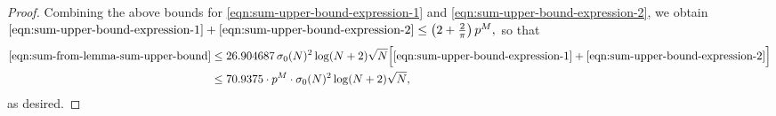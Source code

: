 \documentclass[10pt,a4paper]{amsart}
\begin{document}
\begin{proof}
Combining the above bounds for \eqref{eqn:sum-upper-bound-expression-1} and \eqref{eqn:sum-upper-bound-expression-2}, we obtain $\eqref{eqn:sum-upper-bound-expression-1} + \eqref{eqn:sum-upper-bound-expression-2} \leq \left( 2 + \frac{2}{\pi} \right) p^M,$ so that
\begin{align}
    \eqref{eqn:sum-from-lemma-sum-upper-bound} &\le 26.904687 \, \sigma_0(N)^2 \log(N + 2) \sqrt{N} \Big[\eqref{eqn:sum-upper-bound-expression-1} + \eqref{eqn:sum-upper-bound-expression-2}\Big] \\
    &\le 70.9375 \cdot p^M \cdot \sigma_0(N)^2 \log(N + 2) \sqrt{N},
\end{align}
as desired.
\end{proof}
\end{document}
